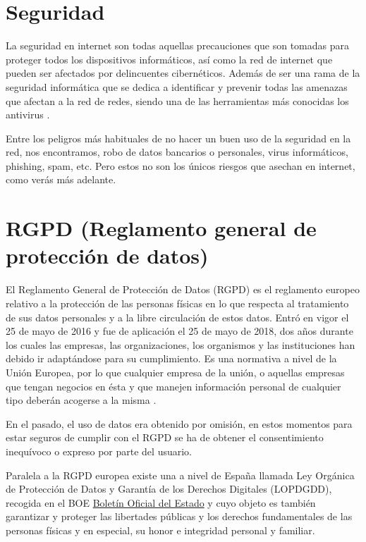 \documentclass[
  spanish,
  a4paper,
  openany]{book}
\begin{document}
\hypertarget{seguridad}{%
\section{Seguridad}\label{seguridad}}

La seguridad en internet son todas aquellas precauciones que son tomadas para proteger todos los dispositivos informáticos, así como la red de internet que pueden ser afectados por delincuentes cibernéticos. Además de ser una rama de la seguridad informática que se dedica a identificar y prevenir todas las amenazas que afectan a la red de redes, siendo una de las herramientas más conocidas los antivirus \citep{seguridad}.

Entre los peligros más habituales de no hacer un buen uso de la seguridad en la red, nos encontramos, robo de datos bancarios o personales, virus informáticos, phishing, spam, etc. Pero estos no son los únicos riesgos que asechan en internet, como verás más adelante.

\hypertarget{rgpd-reglamento-general-de-protecciuxf3n-de-datos}{%
\section{RGPD (Reglamento general de protección de datos)}\label{rgpd-reglamento-general-de-protecciuxf3n-de-datos}}

El Reglamento General de Protección de Datos (RGPD) es el reglamento europeo relativo a la protección de las personas físicas en lo que respecta al tratamiento de sus datos personales y a la libre circulación de estos datos. Entró en vigor el 25 de mayo de 2016 y fue de aplicación el 25 de mayo de 2018, dos años durante los cuales las empresas, las organizaciones, los organismos y las instituciones han debido ir adaptándose para su cumplimiento. Es una normativa a nivel de la Unión Europea, por lo que cualquier empresa de la unión, o aquellas empresas que tengan negocios en ésta y que manejen información personal de cualquier tipo deberán acogerse a la misma \citep{WIKI-rgpd}.

En el pasado, el uso de datos era obtenido por omisión, en estos momentos para estar seguros de cumplir con el RGPD se ha de obtener el consentimiento inequívoco o expreso por parte del usuario.

Paralela a la RGPD europea existe una a nivel de España llamada Ley Orgánica de Protección de Datos y Garantía de los Derechos Digitales (LOPDGDD), recogida en el BOE \href{https://www.boe.es/buscar/doc.php?id=BOE-A-2018-16673}{Boletín Oficial del Estado} y cuyo objeto es también garantizar y proteger las libertades públicas y los derechos fundamentales de las personas físicas y en especial, su honor e integridad personal y familiar.
\end{document}
